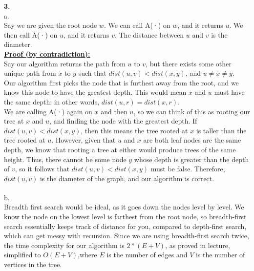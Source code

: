 \documentclass[10pt, letterpaper]{report}
\begin{document}
\newpage
\noindent \large{\textbf{3.} }\\
a.\\
Say we are given the root node $w$. We can call A(·) on $w$, and it returns $u$. We then call A(·) on $u$, and it returns $v$. The distance between $u$ and $v$ is the diameter.\\
\textbf{\underline{Proof (by contradiction):}}\\
Say our algorithm returns the path from $u$ to $v$, but there exists some other unique path from $x$ to $y$ such that \(dist(u,v) < dist(x,y)\), and \(u \neq x \neq y\). \\
Our algorithm first picks the node that is furthest away from the root, and we know this node to have the greatest depth. This would mean $x$ and $u$ must have the same depth: in other words, $dist(u,r) = dist(x,r)$. \\
We are calling A(·) again on $x$ and then $u$, so we can think of this as rooting our tree at $x$ and $u$, and finding the node with the greatest depth. If \(dist(u,v) < dist(x,y)\), then this means the tree rooted at $x$ is taller than the tree rooted at $u$. However, given that $u$ and $x$ are both leaf nodes are the same depth, we know that rooting a tree at either would produce trees of the same height. Thus, there cannot be some node $y$ whose depth is greater than the depth of $v$, so it follows that \(dist(u,v) < dist(x,y)\) must be false. Therefore, $dist(u,v)$ is the diameter of the graph, and our algorithm is correct.\\
\\
b.\\
Breadth first search would be ideal, as it goes down the nodes level by level. We know the node on the lowest level is farthest from the root node, so breadth-first search essentially keeps track of distance for you, compared to depth-first search, which can get messy with recursion. Since we are using breadth-first search twice, the time complexity for our algorithm is $2*(E+V)$, as proved in lecture, simplified to $O(E+V)$,where $E$ is the number of edges and $V$ is the number of vertices in the tree.
\end{document}
